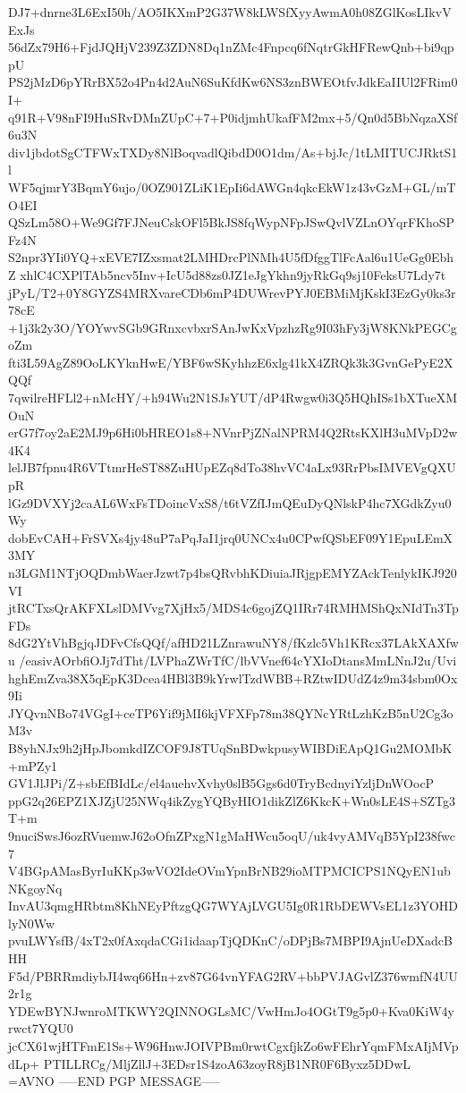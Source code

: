 DJ7+dnrne3L6ExI50h/AO5IKXmP2G37W8kLWSfXyyAwmA0h08ZGlKosLIkvVExJs
56dZx79H6+FjdJQHjV239Z3ZDN8Dq1nZMc4Fnpcq6fNqtrGkHFRewQnb+bi9qppU
PS2jMzD6pYRrBX52o4Pn4d2AuN6SuKfdKw6NS3znBWEOtfvJdkEaIIUl2FRim0I+
q91R+V98nFI9HuSRvDMnZUpC+7+P0idjmhUkafFM2mx+5/Qn0d5BbNqzaXSf6u3N
div1jbdotSgCTFWxTXDy8NlBoqvadlQibdD0O1dm/As+bjJc/1tLMITUCJRktS1l
WF5qjmrY3BqmY6ujo/0OZ901ZLiK1EpIi6dAWGn4qkcEkW1z43vGzM+GL/mTO4EI
QSzLm58O+We9Gf7FJNeuCskOFl5BkJS8fqWypNFpJSwQvlVZLnOYqrFKhoSPFz4N
S2npr3YIi0YQ+xEVE7IZxsmat2LMHDrcPlNMh4U5fDfggTlFcAal6u1UeGg0EbhZ
xhlC4CXPlTAb5ncv5Inv+IcU5d88zs0JZ1eJgYkhn9jyRkGq9sj10FeksU7Ldy7t
jPyL/T2+0Y8GYZS4MRXvareCDb6mP4DUWrevPYJ0EBMiMjKskI3EzGy0ks3r78cE
+1j3k2y3O/YOYwvSGb9GRnxcvbxrSAnJwKxVpzhzRg9I03hFy3jW8KNkPEGCgoZm
fti3L59AgZ89OoLKYknHwE/YBF6wSKyhhzE6xlg41kX4ZRQk3k3GvnGePyE2XQQf
7qwilreHFLl2+nMcHY/+h94Wu2N1SJsYUT/dP4Rwgw0i3Q5HQhISs1bXTueXMOuN
erG7f7oy2aE2MJ9p6Hi0bHREO1s8+NVnrPjZNalNPRM4Q2RtsKXlH3uMVpD2w4K4
lelJB7fpnu4R6VTtmrHeST88ZuHUpEZq8dTo38hvVC4aLx93RrPbsIMVEVgQXUpR
lGz9DVXYj2caAL6WxFsTDoincVxS8/t6tVZfIJmQEuDyQNlskP4hc7XGdkZyu0Wy
dobEvCAH+FrSVXs4jy48uP7aPqJaI1jrq0UNCx4u0CPwfQSbEF09Y1EpuLEmX3MY
n3LGM1NTjOQDmbWaerJzwt7p4bsQRvbhKDiuiaJRjgpEMYZAckTenlykIKJ920VI
jtRCTxsQrAKFXLslDMVvg7XjHx5/MDS4c6gojZQ1IRr74RMHMShQxNIdTn3TpFDs
8dG2YtVhBgjqJDFvCfsQQf/afHD21LZnrawuNY8/fKzlc5Vh1KRcx37LAkXAXfwu
/easivAOrbfiOJj7dTht/LVPhaZWrTfC/lbVVnef64cYXIoDtansMmLNnJ2u/Uvi
hghEmZva38X5qEpK3Dcea4HBl3B9kYrwlTzdWBB+RZtwIDUdZ4z9m34sbm0Ox9Ii
JYQvnNBo74VGgI+ceTP6Yif9jMI6kjVFXFp78m38QYNcYRtLzhKzB5nU2Cg3oM3v
B8yhNJx9h2jHpJbomkdIZCOF9J8TUqSnBDwkpusyWIBDiEApQ1Gu2MOMbK+mPZy1
GV1JlJPi/Z+sbEfBIdLc/el4auehvXvhy0slB5Ggs6d0TryBcdnyiYzljDnWOocP
ppG2q26EPZ1XJZjU25NWq4ikZygYQByHIO1dikZlZ6KkcK+Wn0sLE4S+SZTg3T+m
9nuciSwsJ6ozRVuemwJ62oOfnZPxgN1gMaHWcu5oqU/uk4vyAMVqB5YpI238fwc7
V4BGpAMasByrIuKKp3wVO2IdeOVmYpnBrNB29ioMTPMCICPS1NQyEN1ubNKgoyNq
InvAU3qmgHRbtm8KhNEyPftzgQG7WYAjLVGU5Ig0R1RbDEWVsEL1z3YOHDlyN0Ww
pvuLWYsfB/4xT2x0fAxqdaCGi1idaapTjQDKnC/oDPjBs7MBPI9AjnUeDXadcBHH
F5d/PBRRmdiybJI4wq66Hn+zv87G64vnYFAG2RV+bbPVJAGvlZ376wmfN4UU2r1g
YDEwBYNJwnroMTKWY2QINNOGLsMC/VwHmJo4OGtT9g5p0+Kva0KiW4yrwct7YQU0
jcCX61wjHTFmE1Ss+W96HnwJOIVPBm0rwtCgxfjkZo6wFEhrYqmFMxAIjMVpdLp+
PTILLRCg/MljZllJ+3EDsr1S4zoA63zoyR8jB1NR0F6Byxz5DDwL
=AVNO
-----END PGP MESSAGE-----
